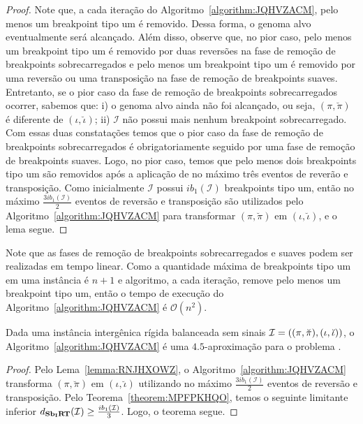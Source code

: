 \begin{proof}
Note que, a cada iteração do Algoritmo~\ref{algorithm:JQHVZACM}, pelo menos um breakpoint tipo um é removido. Dessa forma, o genoma alvo eventualmente será alcançado. Além disso, observe que, no pior caso, pelo menos um breakpoint tipo um é removido por duas reversões na fase de remoção de breakpoints sobrecarregados e pelo menos um breakpoint tipo um é removido por uma reversão ou uma transposição na fase de remoção de breakpoints suaves. Entretanto, se o pior caso da fase de remoção de breakpoints sobrecarregados ocorrer, sabemos que: i) o genoma alvo ainda não foi alcançado, ou seja, $(\pi,\breve\pi)$ é diferente de $(\iota,\breve\iota)$; ii) $\mathcal{I}$ não possui mais nenhum breakpoint sobrecarregado. Com essas duas constatações temos que o pior caso da fase de remoção de breakpoints sobrecarregados é obrigatoriamente seguido por uma fase de remoção de breakpoints suaves. Logo, no pior caso, temos que pelo menos dois breakpoints tipo um são removidos após a aplicação de no máximo três eventos de reverão e transposição. Como inicialmente $\mathcal{I}$ possui $ib_1(\mathcal{I})$ breakpoints tipo um, então no máximo $\frac{3ib_1(\mathcal{I})}{2}$ eventos de reversão e transposição são utilizados pelo Algoritmo~\ref{algorithm:JQHVZACM} para transformar $(\pi,\breve\pi)$ em $(\iota,\breve\iota)$, e o lema segue.
\end{proof}

Note que as fases de remoção de breakpoints sobrecarregados e suaves podem ser realizadas em tempo linear. Como a quantidade máxima de breakpoints tipo um em uma instância é $n+1$ e algoritmo, a cada iteração, remove pelo menos um breakpoint tipo um, então o tempo de execução do Algoritmo~\ref{algorithm:JQHVZACM} é $\mathcal{O}(n^2)$.

\begin{theorem}\label{theorem:QKJNIMOI}
Dada uma instância intergênica rígida balanceada sem sinais $\mathcal{I}=\break((\pi,\breve\pi),(\iota,\breve\iota))$, o Algoritmo~\ref{algorithm:JQHVZACM} é uma $4.5$-aproximação para o problema \SbIRT{}.
\end{theorem}
\begin{proof}
Pelo Lema~\ref{lemma:RNJHXOWZ}, o Algoritmo~\ref{algorithm:JQHVZACM} transforma $(\pi,\breve\pi)$ em $(\iota,\breve\iota)$ utilizando no máximo $\frac{3ib_1(\mathcal{I})}{2}$ eventos de reversão e transposição. Pelo Teorema~\ref{theorem:MPFPKHQO}, temos o seguinte limitante inferior $d_{\textbf{Sb\textsubscript{I}RT}}(\mathcal{I}) \ge \frac{ib_1(\mathcal{I})}{3}$. Logo, o teorema segue. 
\end{proof}

